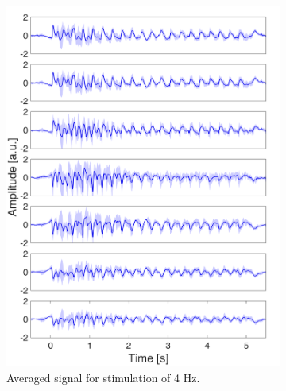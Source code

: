 \documentclass{pracalicmgr}
\begin{document}
	\begin{figure}[H]
	\begin{subfigure}{.5\textwidth}
		\centering
		\includegraphics[width=1.\linewidth]{srednie_4Hz_5s.png}
		\caption{Averaged signal for stimulation of 4 Hz.}
		\label{rys:srednie_4Hz}
	\end{subfigure}
	\begin{subfigure}{.5\textwidth}
	\centering

\end{subfigure}
\end{figure}
\end{document}
